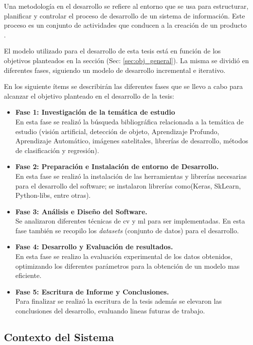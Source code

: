 Una metodología en el desarrollo se refiere al entorno que se usa para estructurar, planificar y controlar el proceso de desarrollo de un sistema de información. Este proceso es un conjunto de actividades que conducen a la creación de un producto \citep{sommerville}.


El modelo utilizado para el desarrollo de esta tesis está en función de los objetivos planteados en la sección (Sec: \ref{sec:obj_general}). La misma se dividió en diferentes fases, siguiendo un modelo de desarrollo incremental e iterativo.

En los siguiente ítems se describirán las diferentes fases que se llevo a cabo para alcanzar el objetivo planteado en el desarrollo de la tesis:
\begin{itemize}
	\item \textbf{Fase 1: Investigación de la temática de estudio}\\
	En esta fase se realizó la búsqueda bibliográfica relacionada a la temática de estudio (visión artificial, detección de objeto, 
	Aprendizaje Profundo, Aprendizaje Automático, imágenes satelitales, librerías de desarrollo, métodos de clasificación y regresión).
	\item \textbf{Fase 2: Preparación e Instalación de entorno de Desarrollo.}\\
	En esta fase se realizó la instalación de las herramientas y librerías necesarias para el desarrollo del software; se instalaron librerías  
como(Keras, SkLearn, Python-libs, entre otras).
	\item \textbf{Fase 3: Análisis e Diseño del Software.}\\
	Se analizaron diferentes técnicas de \ac{cv} y \ac{ml} para ser implementadas. En esta fase también se recopilo los \textit{datasets} (conjunto de datos) para el desarrollo.
	\item \textbf{Fase 4: Desarrollo y Evaluación de resultados.}\\
	En esta fase se realizo la evaluación experimental de los datos obtenidos, optimizando los diferentes parámetros para la obtención de un 
modelo mas eficiente.
	\item \textbf{Fase 5: Escritura de Informe y Conclusiones.}\\
	Para finalizar se realizó la escritura de la tesis además se elevaron las conclusiones del desarrollo, evaluando lineas futuras de trabajo.
\end{itemize}


\subsection{Contexto del Sistema}\label{sub:casodeuso}

